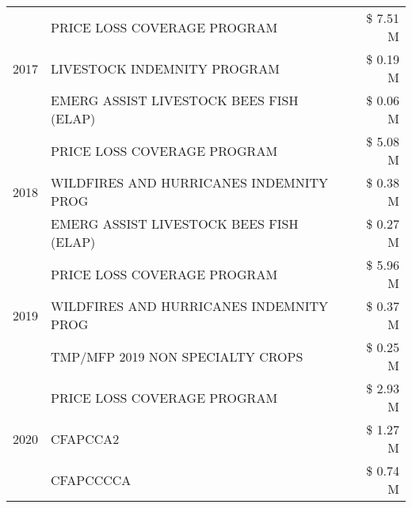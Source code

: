 \begin{tabular}{llr}
\cline{1-3}
\multirow[t]{3}{*}{2017} & PRICE LOSS COVERAGE PROGRAM & \$ 7.51 M \\
 & LIVESTOCK INDEMNITY PROGRAM & \$ 0.19 M \\
 & EMERG ASSIST LIVESTOCK BEES FISH (ELAP) & \$ 0.06 M \\
\cline{1-3}
\multirow[t]{3}{*}{2018} & PRICE LOSS COVERAGE PROGRAM & \$ 5.08 M \\
 & WILDFIRES AND HURRICANES INDEMNITY PROG & \$ 0.38 M \\
 & EMERG ASSIST LIVESTOCK BEES FISH (ELAP) & \$ 0.27 M \\
\cline{1-3}
\multirow[t]{3}{*}{2019} & PRICE LOSS COVERAGE PROGRAM & \$ 5.96 M \\
 & WILDFIRES AND HURRICANES INDEMNITY PROG & \$ 0.37 M \\
 & TMP/MFP 2019 NON SPECIALTY CROPS & \$ 0.25 M \\
\cline{1-3}
\multirow[t]{3}{*}{2020} & PRICE LOSS COVERAGE PROGRAM & \$ 2.93 M \\
 & CFAPCCA2 & \$ 1.27 M \\
 & CFAPCCCCA & \$ 0.74 M \\
\cline{1-3}
\bottomrule
\end{tabular}
